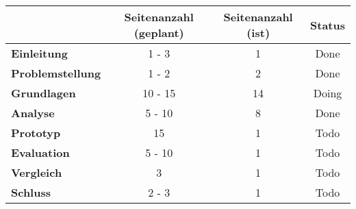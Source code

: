 \begin{table}[H]
\centering
\begin{tabular}{l|c|c|c}
                               & \textbf{Seitenanzahl (geplant)} & \textbf{Seitenanzahl (ist)} & \textbf{Status}        \\ \hline
\textbf{Einleitung}            & 1 - 3                           & {\color{yellow} 1}          & {\color{green} Done}   \\ \hline
\textbf{Problemstellung}       & 1 - 2                           & {\color{green} 2}           & {\color{green} Done}   \\ \hline
\textbf{Grundlagen}            & 10 - 15                         & {\color{green} 14}          & {\color{yellow} Doing} \\ \hline
\textbf{Analyse}               & 5 - 10                          & {\color{green} 8}           & {\color{green} Done}   \\ \hline
\textbf{Prototyp}              & 15                              & {\color{red} 1}             & {\color{red} Todo}     \\ \hline
\textbf{Evaluation}            & 5 - 10                          & {\color{red} 1}             & {\color{red} Todo}     \\ \hline
\textbf{Vergleich}             & 3                               & {\color{red} 1}             & {\color{red} Todo}     \\ \hline
\textbf{Schluss}               & 2 - 3                           & {\color{red} 1}             & {\color{red} Todo}     \\
\end{tabular}
\end{table}